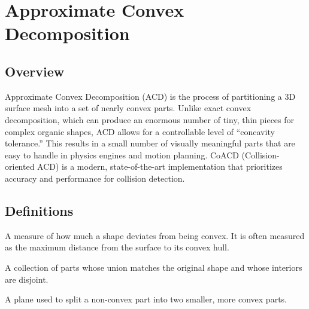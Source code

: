 \section{Approximate Convex Decomposition}
\label{sec:coacd}

\subsection{Overview}
Approximate Convex Decomposition (ACD) is the process of partitioning a 3D surface mesh into a set of nearly convex parts\cite{wei2022}. Unlike exact convex decomposition, which can produce an enormous number of tiny, thin pieces for complex organic shapes, ACD allows for a controllable level of ``concavity tolerance.'' This results in a small number of visually meaningful parts that are easy to handle in physics engines and motion planning. CoACD (Collision-oriented ACD) is a modern, state-of-the-art implementation that prioritizes accuracy and performance for collision detection.

\subsection{Definitions}
\begin{definition}[Concavity]\label{def:concavity}
A measure of how much a shape deviates from being convex. It is often measured as the maximum distance from the surface to its convex hull.
\end{definition}

\begin{definition}\label{def:convex_decomposition}
A collection of parts whose union matches the original shape and whose interiors are disjoint.
\end{definition}

\begin{definition}\label{def:cutting_plane}
A plane used to split a non-convex part into two smaller, more convex parts.
\end{definition}

